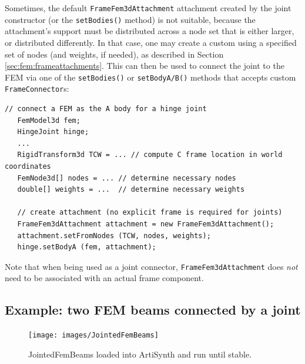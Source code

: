 Sometimes, the default {\tt FrameFem3dAttachment} attachment created by the
joint constructor (or the {\tt setBodies()} method) is not suitable, because
the attachment's support must be distributed across a node set that is either
larger, or distributed differently. In that case, one may create a custom
using a specified set of nodes (and weights, if needed), as described in
Section \ref{sec:fem:frameattachments}. This can then be used to connect the
joint to the FEM via one of the {\tt setBodies()} or {\tt setBodyA/B()} methods
that accepts custom {\tt FrameConnector}s:
%
\begin{lstlisting}[]
   // connect a FEM as the A body for a hinge joint
   FemModel3d fem;
   HingeJoint hinge;
   ...
   RigidTransform3d TCW = ... // compute C frame location in world coordinates
   FemNode3d[] nodes = ... // determine necessary nodes
   double[] weights = ...  // determine necessary weights

   // create attachment (no explicit frame is required for joints)
   FrameFem3dAttachment attachment = new FrameFem3dAttachment();
   attachment.setFromNodes (TCW, nodes, weights);
   hinge.setBodyA (fem, attachment);   
\end{lstlisting}
%
Note that when being used as a joint connector, {\tt FrameFem3dAttachment} does
{\it not} need to be associated with an actual frame component.

\subsection{Example: two FEM beams connected by a joint}

\begin{figure}[ht]
	\centering
	\texttt{[image: images/JointedFemBeams]}
	\caption{JointedFemBeams loaded into ArtiSynth and run until stable.}
	\label{fig:fem:jointFemBeams}
\end{figure}

